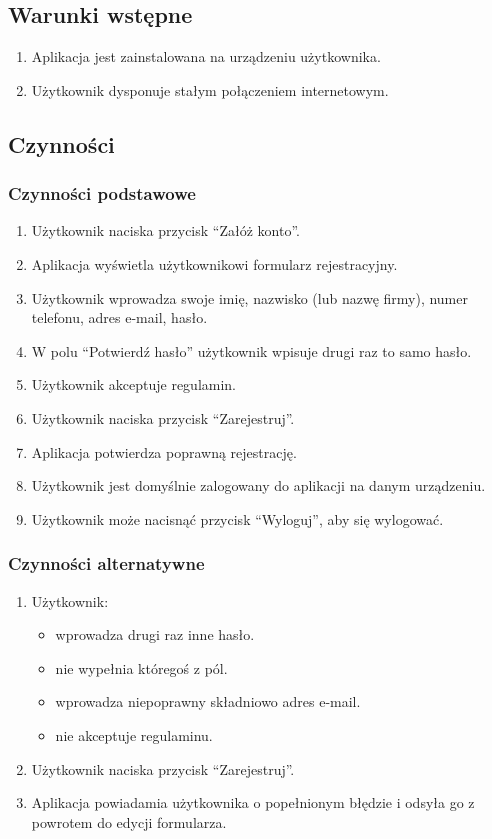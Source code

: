 \documentclass[licencjacka]{pracamgr}
\begin{document}
    \subsection{Warunki wstępne}
    \begin{enumerate}
        \item Aplikacja jest zainstalowana na urządzeniu użytkownika.
        \item Użytkownik dysponuje stałym połączeniem internetowym.
    \end{enumerate}
    \subsection{Czynności}
    \subsubsection{Czynności podstawowe}
    \begin{enumerate}
        \item Użytkownik naciska przycisk ``Załóż konto''.
        \item Aplikacja wyświetla użytkownikowi formularz rejestracyjny.
        \item Użytkownik wprowadza swoje imię, nazwisko (lub nazwę firmy), numer telefonu, adres e-mail, hasło.
        \item W polu ``Potwierdź hasło'' użytkownik wpisuje drugi raz to samo hasło.
        \item Użytkownik akceptuje regulamin.
        \item Użytkownik naciska przycisk ``Zarejestruj''.
        \item Aplikacja potwierdza poprawną rejestrację.
     \item Użytkownik jest domyślnie zalogowany do aplikacji na danym urządzeniu.
     \item Użytkownik może nacisnąć przycisk ``Wyloguj'', aby się wylogować.
    \end{enumerate}
    \subsubsection{Czynności alternatywne}
    \begin{enumerate}
        \item Użytkownik:
        \begin{itemize}
            \item wprowadza drugi raz inne hasło.
            \item nie wypełnia któregoś z pól.
            \item wprowadza niepoprawny składniowo adres e-mail.
            \item nie akceptuje regulaminu.
        \end{itemize}
        \item Użytkownik naciska przycisk ``Zarejestruj''.
        \item Aplikacja powiadamia użytkownika o popełnionym błędzie i odsyła go z powrotem do edycji formularza.
    \end{enumerate}
\end{document}
